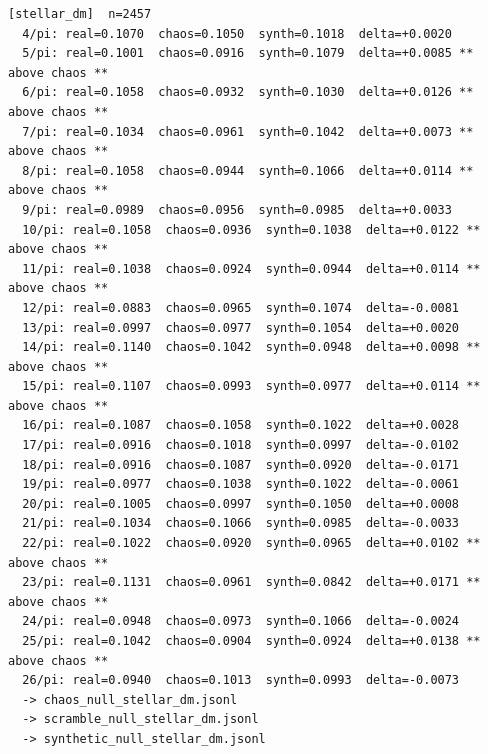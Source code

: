 \documentclass[11pt, letterpaper, openany]{book}
\begin{document}
\begin{empiricalbox}
\begin{lstlisting}[style=terminal]
[stellar_dm]  n=2457
  4/pi: real=0.1070  chaos=0.1050  synth=0.1018  delta=+0.0020
  5/pi: real=0.1001  chaos=0.0916  synth=0.1079  delta=+0.0085 ** above chaos **
  6/pi: real=0.1058  chaos=0.0932  synth=0.1030  delta=+0.0126 ** above chaos **
  7/pi: real=0.1034  chaos=0.0961  synth=0.1042  delta=+0.0073 ** above chaos **
  8/pi: real=0.1058  chaos=0.0944  synth=0.1066  delta=+0.0114 ** above chaos **
  9/pi: real=0.0989  chaos=0.0956  synth=0.0985  delta=+0.0033
  10/pi: real=0.1058  chaos=0.0936  synth=0.1038  delta=+0.0122 ** above chaos **
  11/pi: real=0.1038  chaos=0.0924  synth=0.0944  delta=+0.0114 ** above chaos **
  12/pi: real=0.0883  chaos=0.0965  synth=0.1074  delta=-0.0081
  13/pi: real=0.0997  chaos=0.0977  synth=0.1054  delta=+0.0020
  14/pi: real=0.1140  chaos=0.1042  synth=0.0948  delta=+0.0098 ** above chaos **
  15/pi: real=0.1107  chaos=0.0993  synth=0.0977  delta=+0.0114 ** above chaos **
  16/pi: real=0.1087  chaos=0.1058  synth=0.1022  delta=+0.0028
  17/pi: real=0.0916  chaos=0.1018  synth=0.0997  delta=-0.0102
  18/pi: real=0.0916  chaos=0.1087  synth=0.0920  delta=-0.0171
  19/pi: real=0.0977  chaos=0.1038  synth=0.1022  delta=-0.0061
  20/pi: real=0.1005  chaos=0.0997  synth=0.1050  delta=+0.0008
  21/pi: real=0.1034  chaos=0.1066  synth=0.0985  delta=-0.0033
  22/pi: real=0.1022  chaos=0.0920  synth=0.0965  delta=+0.0102 ** above chaos **
  23/pi: real=0.1131  chaos=0.0961  synth=0.0842  delta=+0.0171 ** above chaos **
  24/pi: real=0.0948  chaos=0.0973  synth=0.1066  delta=-0.0024
  25/pi: real=0.1042  chaos=0.0904  synth=0.0924  delta=+0.0138 ** above chaos **
  26/pi: real=0.0940  chaos=0.1013  synth=0.0993  delta=-0.0073
  -> chaos_null_stellar_dm.jsonl
  -> scramble_null_stellar_dm.jsonl
  -> synthetic_null_stellar_dm.jsonl


\end{lstlisting}
\end{empiricalbox}
\end{document}
